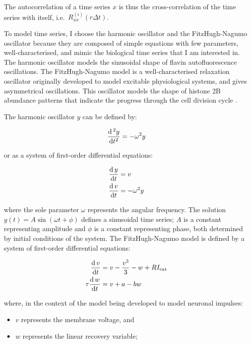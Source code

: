The autocorrelation of a time series $x$ is thus the cross-correlation of the time series with itself, i.e.\ $R_{xx}^{(i)}(r \Delta t)$.

To model time series, I choose the harmonic oscillator and the FitzHugh-Nagumo oscillator because they are composed of simple equations with few parameters, well-characterised, and mimic the biological time series that I am interested in.
The harmonic oscillator models the sinusoidal shape of flavin autofluorescence oscillations.
The FitzHugh-Nagumo model \parencite{fitzhughImpulsesPhysiologicalStates1961} is a well-characterised relaxation oscillator originally developed to model excitable physiological systems, and gives asymmetrical oscillations.
This oscillator models the shape of histone 2B abundance patterns that indicate the progress through the cell division cycle \parencite{garmendia-torresMultipleInputsEnsure2018}.

The harmonic oscillator $y$ can be defined by:

\begin{equation}
  \frac{\mathrm{d} \,^{2} y}{\mathrm{d} t^{2}} = -\omega^{2}y
  \label{eq:harmonic}
\end{equation}

or as a system of first-order differential equations:

\begin{equation}
  \begin{aligned}
    \frac{\mathrm{d} \, y}{\mathrm{d} t} &= v \\
    \frac{\mathrm{d} \, v}{\mathrm{d} t} &= -\omega^{2}y
  \end{aligned}
  \label{eq:harmonic-1o}
\end{equation}

where the sole parameter $\omega$ represents the angular frequency.
The solution $y(t) = A \sin(\omega{}t + \phi)$ defines a sinusoidal time series; $A$ is a constant representing amplitude and $\phi$ is a constant representing phase, both determined by initial conditions of the system.
The FitzHugh-Nagumo model is defined by a system of first-order differential equations:

\begin{equation}
  \begin{aligned}
    \frac{\mathrm{d} \, v}{\mathrm{d} t} &= v - \frac{v^3}{3} - w + RI_{\mathrm{ext}} \\
    \tau \frac{\mathrm{d} \, w}{\mathrm{d} t} &= v + a - bw
  \end{aligned}
  \label{eq:fhn}
\end{equation}

where, in the context of the model being developed to model neuronal impulses:
\begin{itemize}
  \item $v$ represents the membrane voltage, and
  \item $w$ represents the linear recovery variable;
\end{itemize}

